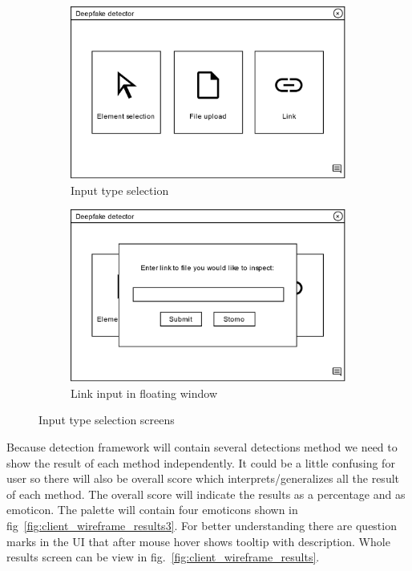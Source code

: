 \begin{figure}[H]
    \begin{subfigure}[h]{.498\linewidth}
        \centering
        \includegraphics[width=1\linewidth]{other-fig/client_wireframe_input_selection.png}
        \caption{Input type selection}
    \end{subfigure}
    \hfill
    \begin{subfigure}[h]{.498\linewidth}
        \centering
        \includegraphics[width=1\linewidth]{other-fig/client_wireframe_input_selection2.png}
        \caption{Link input in floating window}
    \end{subfigure}
    \caption{Input type selection screens}
    \label{fig:client_wireframe_input_selection}
\end{figure}

Because detection framework will contain several detections method we need to show the result of each method independently. It could be a little confusing for user so there will also be overall score which interprets/generalizes all the result of each method. The overall score will indicate the results as a percentage and as emoticon. The palette will contain four emoticons shown in fig~\ref{fig:client_wireframe_results3}. For better understanding there are question marks in the UI that after mouse hover shows tooltip with description. Whole results screen can be view in fig.~\ref{fig:client_wireframe_results}.

